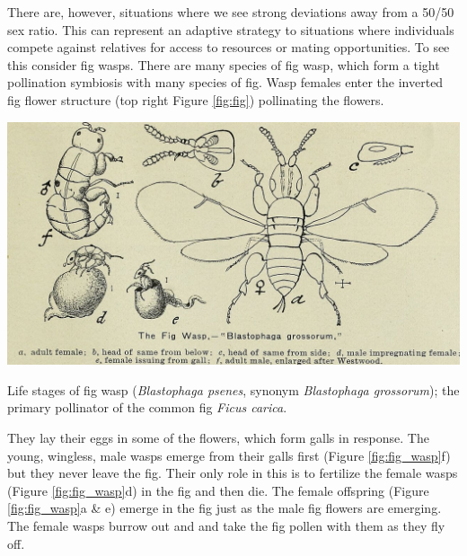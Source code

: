 {There are, however, situations where we see strong deviations away
from a 50/50 sex ratio. This can represent an adaptive strategy to
situations where individuals compete against relatives for access to resources or
mating opportunities. To see this consider fig wasps. There are many
species of fig wasp, which form a tight pollination symbiosis with many species of 
fig. Wasp females enter the inverted fig flower structure (top right
Figure \ref{fig:fig}) pollinating the flowers. \begin{marginfigure}
  \begin{center}
    \includegraphics[width= \textwidth]{illustration_images/single_locus_selection/Fig_wasp/1280px-A_descriptive_catalogue_of_fruit_and_forest_trees_vines_and_shrubs_choice_palms_and_roses.jpg}
\end{center}  %
\caption{
Life stages of fig wasp ({\it Blastophaga psenes}, synonym {\it Blastophaga
    grossorum}); the primary pollinator of the common fig {\it Ficus carica}.
} \label{fig:fig_wasp}
\end{marginfigure} They lay their eggs in some of the
flowers, which form galls in response.  The young, wingless, male
wasps emerge from their galls first (Figure \ref{fig:fig_wasp}f) but
they never leave the fig. Their only role in this is
to fertilize the female wasps (Figure \ref{fig:fig_wasp}d) in the fig and then die. The female
offspring (Figure \ref{fig:fig_wasp}a \& e) emerge in the fig just as the male fig flowers
are emerging. The female wasps burrow out and and take the fig pollen with them as they fly off.

}
